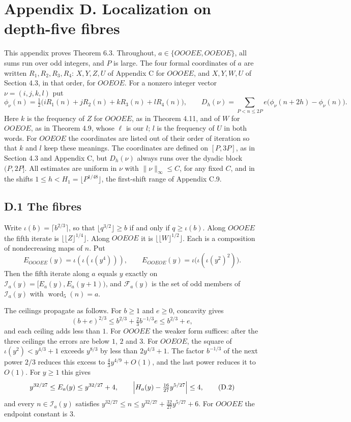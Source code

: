 \documentclass[11pt,a4paper]{article}
\begin{document}
\section{Appendix D. Localization on depth-five
fibres}\label{appendix-d.-localization-on-depth-five-fibres}

This appendix proves Theorem 6.3. Throughout, \(a\in\{OOOEE,OOEOE\}\),
all sums run over odd integers, and \(P\) is large. The four formal
coordinates of \(a\) are written \(R_1,R_2,R_3,R_4\): \(X,Y,Z,U\) of
Appendix C for \(OOOEE\), and \(X,Y,W,U\) of Section 4.3, in that order,
for \(OOEOE\). For a nonzero integer vector \(\nu=(i,j,k,l)\) put \[
\phi_\nu(n)=\tfrac12\bigl(iR_1(n)+jR_2(n)+kR_3(n)+lR_4(n)\bigr),
\qquad
D_h(\nu)=\sum_{P<n\le2P}e\bigl(\phi_\nu(n+2h)-\phi_\nu(n)\bigr).
\tag{D.1}
\] Here \(k\) is the frequency of \(Z\) for \(OOOEE\), as in Theorem
4.11, and of \(W\) for \(OOEOE\), as in Theorem 4.9, whose \(\ell\) is
our \(l\); \(l\) is the frequency of \(U\) in both words. For \(OOEOE\)
the coordinates are listed out of their order of iteration so that \(k\)
and \(l\) keep these meanings. The coordinates are defined on
\([P,3P]\), as in Section 4.3 and Appendix C, but \(D_h(\nu)\) always
runs over the dyadic block \((P,2P]\). All estimates are uniform in
\(\nu\) with \(\|\nu\|_\infty\le C\), for any fixed \(C\), and in the
shifts \(1\le h<H_1=\lfloor P^{1/48}\rfloor\), the first-shift range of
Appendix C.9.

\subsection{D.1 The fibres}\label{d.1-the-fibres}

Write \(\iota(b)=\lceil b^{2/3}\rceil\), so that
\(\lfloor q^{3/2}\rfloor\ge b\) if and only if \(q\ge\iota(b)\). Along
\(OOOEE\) the fifth iterate is \(\lfloor\lfloor Z\rfloor^{1/4}\rfloor\).
Along \(OOEOE\) it is \(\lfloor\lfloor W\rfloor^{1/2}\rfloor\). Each is
a composition of nondecreasing maps of \(n\). Put \[
E_{OOOEE}(y)=\iota(\iota(\iota(y^4))),\qquad
E_{OOEOE}(y)=\iota\bigl(\iota(\iota(y^2)^2)\bigr).
\] Then the fifth iterate along \(a\) equals \(y\) exactly on
\(\mathcal I_a(y)=[E_a(y),E_a(y+1))\), and \(\mathcal F_a(y)\) is the
set of odd members of \(\mathcal I_a(y)\) with
\(\operatorname{word}_5(n)=a\).

The ceilings propagate as follows. For \(b\ge1\) and \(e\ge0\),
concavity gives \[
(b+e)^{2/3}\le b^{2/3}+\tfrac23b^{-1/3}e\le b^{2/3}+e,
\] and each ceiling adds less than \(1\). For \(OOOEE\) the weaker form
suffices: after the three ceilings the errors are below \(1\), \(2\) and
\(3\). For \(OOEOE\), the square of \(\iota(y^2)<y^{4/3}+1\) exceeds
\(y^{8/3}\) by less than \(2y^{4/3}+1\). The factor \(b^{-1/3}\) of the
next power \(2/3\) reduces this excess to \(\tfrac43y^{4/9}+O(1)\), and
the last power reduces it to \(O(1)\). For \(y\ge1\) this gives \[
y^{32/27}\le E_a(y)\le y^{32/27}+4,\qquad
\Bigl|H_a(y)-\tfrac{16}{27}y^{5/27}\Bigr|\le4,
\tag{D.2}
\] and every \(n\in\mathcal I_a(y)\) satisfies
\(y^{32/27}\le n\le y^{32/27}+\tfrac{32}{27}y^{5/27}+6\). For \(OOOEE\)
the endpoint constant is \(3\).
\end{document}
